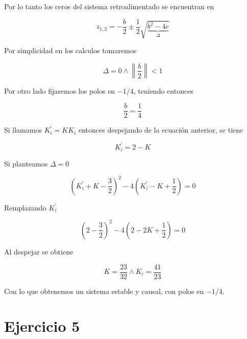 \documentclass{article}
\begin{document}
    Por lo tanto los ceros del sistema retroalimentado se encuentran en 

    \begin{equation}
        z_{1,2} = -\frac{b}{2} \pm \frac{1}{2} \sqrt{ \underbrace{ b^2 - 4c }_{\Delta} }
    \end{equation}

    Por simplicidad en los calculos tomaremos 

    \begin{equation}
        \Delta = 0 \land \left\| \frac{b}{2} \right\| < 1
    \end{equation}

    Por otro lado fijaremos los polos en $-1/4$, teniendo entonces 

    \begin{equation}
        \frac{b}{2} = \frac{1}{4}
    \end{equation}

    Si llamamos $K_i^\prime = K K_i$ entonces despejando de la ecuación anterior, se tiene

    \begin{equation}
        K_i^\prime = 2 - K
    \end{equation}

    Si planteamos $\Delta = 0$ 

    \begin{equation}
        \left( K_i^\prime + K - \frac{3}{2} \right)^2 - 4 \left( K_i^\prime - K + \frac{1}{2} \right) = 0
    \end{equation}

    Remplazando $K_i^\prime$

    \begin{equation}
        \left( 2 - \frac{3}{2} \right)^2 - 4 \left( 2 - 2K + \frac{1}{2} \right) = 0
    \end{equation}

    Al despejar se obtiene 

    \begin{equation}
        K = \frac{23}{32} \land K_i = \frac{41}{23}
    \end{equation}

    Con lo que obtenemos un sistema estable y causal, con polos en $-1/4$.

    \section{Ejercicio 5}
\end{document}
